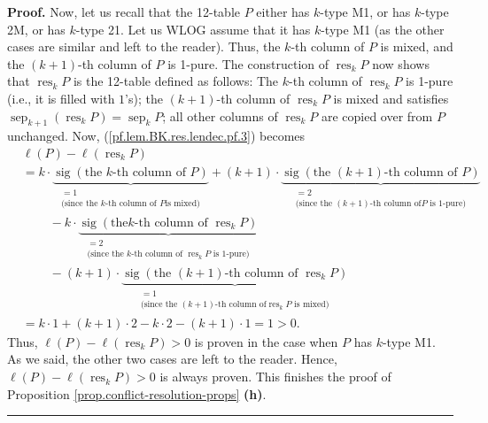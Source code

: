 \documentclass[numbers=enddot,12pt,final,onecolumn,notitlepage]{scrartcl}%
\theoremstyle{definition}
\newenvironment{proof}[1][Proof]{\noindent\textbf{#1.} }{\ \rule{0.5em}{0.5em}}
\newenvironment{verlong}{}{}
\begin{document}
\begin{verlong}
\begin{proof}
Now, let us recall that the 12-table $P$ either has $k$-type M1, or has
$k$-type 2M, or has $k$-type 21. Let us WLOG assume that it has $k$-type M1
(as the other cases are similar and left to the reader). Thus, the $k$-th
column of $P$ is mixed, and the $\left(  k+1\right)  $-th column of $P$ is
1-pure. The construction of $\operatorname*{res}\nolimits_{k}P$ now shows that
$\operatorname*{res}_{k}P$ is the 12-table defined as follows: The $k$-th
column of $\operatorname*{res}_{k}P$ is 1-pure (i.e., it is filled with
$1$'s); the $\left(  k+1\right)  $-th column of $\operatorname*{res}%
\nolimits_{k}P$ is mixed and satisfies $\operatorname*{sep}\nolimits_{k+1}%
\left(  \operatorname*{res}\nolimits_{k}P\right)  =\operatorname*{sep}%
\nolimits_{k}P$; all other columns of $\operatorname*{res}\nolimits_{k}P$ are
copied over from $P$ unchanged. Now, (\ref{pf.lem.BK.res.lendec.pf.3}) becomes%
\begin{align*}
&  \ell\left(  P\right)  -\ell\left(  \operatorname*{res}\nolimits_{k}P\right)
\\
&  =k\cdot\underbrace{\operatorname*{sig}\left(  \text{the }k\text{-th column
of }P\right)  }_{\substack{=1\\\text{(since the }k\text{-th column of }P\text{
is mixed)}}}+\left(  k+1\right)  \cdot\underbrace{\operatorname*{sig}\left(
\text{the }\left(  k+1\right)  \text{-th column of }P\right)  }%
_{\substack{=2\\\text{(since the }\left(  k+1\right)  \text{-th column of
}P\text{ is 1-pure)}}}\\
&  \ \ \ \ \ \ \ \ \ \ -k\cdot\underbrace{\operatorname*{sig}\left(  \text{the
}k\text{-th column of }\operatorname*{res}\nolimits_{k}P\right)
}_{\substack{=2\\\text{(since the }k\text{-th column of }\operatorname*{res}%
\nolimits_{k}P\text{ is 1-pure)}}}\\
&  \ \ \ \ \ \ \ \ \ \ -\left(  k+1\right)  \cdot
\underbrace{\operatorname*{sig}\left(  \text{the }\left(  k+1\right)
\text{-th column of }\operatorname*{res}\nolimits_{k}P\right)  }%
_{\substack{=1\\\text{(since the }\left(  k+1\right)  \text{-th column of
}\operatorname*{res}\nolimits_{k}P\text{ is mixed)}}}\\
&  =k\cdot1+\left(  k+1\right)  \cdot2-k\cdot2-\left(  k+1\right)  \cdot1=1>0.
\end{align*}
Thus, $\ell\left(  P\right)  -\ell\left(  \operatorname*{res}\nolimits_{k}%
P\right)  >0$ is proven in the case when $P$ has $k$-type M1. As we said, the
other two cases are left to the reader. Hence, $\ell\left(  P\right)
-\ell\left(  \operatorname*{res}\nolimits_{k}P\right)  >0$ is always proven.
This finishes the proof of Proposition \ref{prop.conflict-resolution-props}
\textbf{(h)}.
\end{proof}
\end{verlong}
\end{document}
